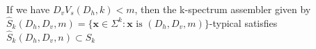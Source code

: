 \documentclass[preview]{standalone}
\begin{document}
\begin{center}
If we have ${D}_v{V}_s({D}_h, k) < m$, then the k-spectrum assembler given by $\hat{S}_k({D}_h, {D}_v, m) = \{\textbf{x} \in \Sigma^k: \textbf{x} \text{ is }({D}_h, {D}_v, m)\}$-typical satisfies $\hat{S}_k({D}_h, {D}_v, n) \subset {S}_k$
\end{center}
\end{document}
